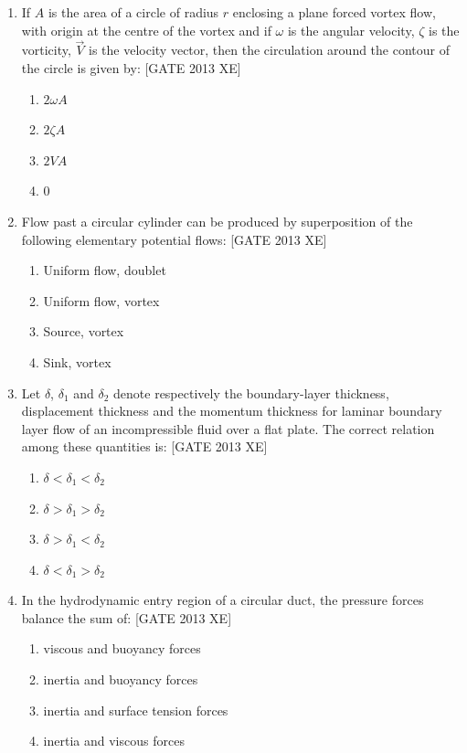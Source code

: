 \documentclass[journal,12pt,onecolumn]{IEEEtran}
\theoremstyle{remark}
\begin{document}
\begin{enumerate}
\item If $A$ is the area of a circle of radius $r$ enclosing a plane forced vortex flow, with origin at the centre of the vortex and if $\omega$ is the angular velocity, $\zeta$ is the vorticity, $\vec{V}$ is the velocity vector, then the circulation around the contour of the circle is given by: \hfill[GATE 2013 XE]
\begin{multicols}{2}
\begin{enumerate}
    \item $2\omega A$
    \item $2\zeta A$
    \item $2V A$
    \item $0$
\end{enumerate}
\end{multicols}

\item Flow past a circular cylinder can be produced by superposition of the following elementary potential flows: \hfill[GATE 2013 XE]
\begin{multicols}{2}
\begin{enumerate}
    \item Uniform flow, doublet
    \item Uniform flow, vortex
    \item Source, vortex
    \item Sink, vortex
\end{enumerate}
\end{multicols}

\item Let $\delta$, $\delta_1$ and $\delta_2$ denote respectively the boundary-layer thickness, displacement thickness and the momentum thickness for laminar boundary layer flow of an incompressible fluid over a flat plate. The correct relation among these quantities is: \hfill[GATE 2013 XE]
\begin{multicols}{2}
\begin{enumerate}
    \item $\delta < \delta_1 < \delta_2$
    \item $\delta > \delta_1 > \delta_2$
    \item $\delta > \delta_1 < \delta_2$
    \item $\delta < \delta_1 > \delta_2$
\end{enumerate}
\end{multicols}

\item In the hydrodynamic entry region of a circular duct, the pressure forces balance the sum of: \hfill[GATE 2013 XE]
\begin{multicols}{2}
\begin{enumerate}
    \item viscous and buoyancy forces
    \item inertia and buoyancy forces
    \item inertia and surface tension forces
    \item inertia and viscous forces
\end{enumerate}
\end{multicols}


\end{enumerate}
\end{document}
